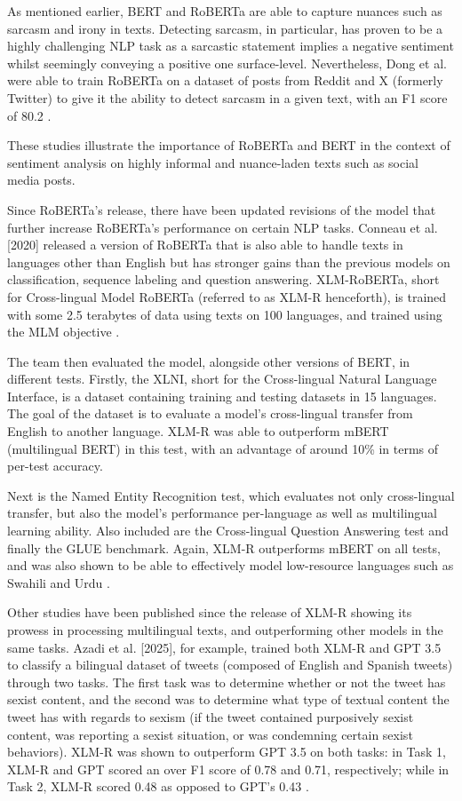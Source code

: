As mentioned earlier, BERT and RoBERTa are able to capture nuances such as sarcasm and irony in texts. Detecting sarcasm, in particular, has proven to be a highly challenging NLP task as a sarcastic statement implies a negative sentiment whilst seemingly conveying a positive one surface-level. Nevertheless, Dong et al. were able to train RoBERTa on a dataset of posts from Reddit and X (formerly Twitter) to give it the ability to detect sarcasm in a given text, with an F1 score of 80.2 \cite{Dong-2020}.

These studies illustrate the importance of RoBERTa and BERT in the context of sentiment analysis on highly informal and nuance-laden texts such as social media posts. 

Since RoBERTa’s release, there have been updated revisions of the model that further increase RoBERTa’s performance on certain NLP tasks. Conneau et al. [2020] released a version of RoBERTa that is also able to handle texts in languages other than English but has stronger gains than the previous models on classification, sequence labeling and question answering. XLM-RoBERTa, short for Cross-lingual Model RoBERTa (referred to as XLM-R henceforth), is trained with some 2.5 terabytes of data using texts on 100 languages, and trained using the MLM objective \cite{Conneau-2020}.

The team then evaluated the model, alongside other versions of BERT, in different tests. Firstly, the XLNI, short for the Cross-lingual Natural Language Interface, is a dataset containing training and testing datasets in 15 languages. The goal of the dataset is to evaluate a model’s cross-lingual transfer from English to another language. XLM-R was able to outperform mBERT (multilingual BERT) in this test, with an advantage of around 10\% in terms of per-test accuracy.

Next is the Named Entity Recognition test, which evaluates not only cross-lingual transfer, but also the model’s performance per-language as well as multilingual learning ability. Also included are the Cross-lingual Question Answering test and finally the GLUE benchmark. Again, XLM-R outperforms mBERT on all tests, and was also shown to be able to effectively model low-resource languages such as Swahili and Urdu \cite{Conneau-2020}.

Other studies have been published since the release of XLM-R showing its prowess in processing multilingual texts, and outperforming other models in the same tasks. Azadi et al. [2025], for example, trained both XLM-R and GPT 3.5 to classify a bilingual dataset of tweets (composed of English and Spanish tweets) through two tasks. The first task was to determine whether or not the tweet has sexist content, and the second was to determine what type of textual content the tweet has with regards to sexism (if the tweet contained purposively sexist content, was reporting a sexist situation, or was condemning certain sexist behaviors). XLM-R was shown to outperform GPT 3.5 on both tasks: in Task 1, XLM-R and GPT scored an over F1 score of 0.78 and 0.71, respectively; while in Task 2, XLM-R scored 0.48 as opposed to GPT’s 0.43 \cite{Azadi-2025}.

